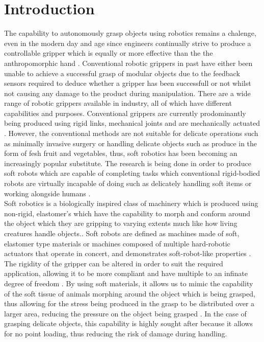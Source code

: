 \documentclass[11pt,twocolumn]{article}
\begin{document}
\section{Introduction}
The capability to autonomously grasp objects using robotics remains a chalenge, even in the modern day and age since engineers continually strive to produce a controllable gripper which is equally or more effective than the the anthropomorphic hand \cite{bogue2016flexible}. Conventional robotic grippers in past have either been unable to achieve a successful grasp of modular objects due to the feedback sensors required to deduce whether a gripper has been successfull or not whilst not causing any damage to the product during manipulation. There are a wide range of robotic grippers available in industry, all of which have different capabilities and purposes. Conventional grippers are currently prodominantly being produced using rigid links, mechanical joints and are mechanically actuated \cite{ilievski2011soft}. However, the conventional methods are not suitable for delicate operations such as minimally invasive surgery or handling delicate objects such as produce in the form of fesh fruit and vegetables, thus, soft robotics has been becoming an increasingly popular substitute. The research is being done in order to produce soft robots which are capable of completing tasks which conventional rigid-bodied robots are virtually incapable of doing such as delicately handling soft items or working alongside humans \cite{bilodeau2015monolithic}.
\\
\newline
Soft robotics is a biologically inspired class of machinery which is produced using non-rigid, elastomer's which have the capability to morph and conform around the object which they are gripping to varying extents much like how living creatures handle objects.\cite{ilievski2011soft,bilodeau2015monolithic,mosadegh2014pneumatic,martinez2013robotic,marchese2015recipe}. Soft robots are defined as machines made of soft, elastomer type materials or machines composed of multiple hard-robotic actuators that operate in concert, and demonstrates soft-robot-like properties \cite{ilievski2011soft}. The rigidity of the gripper can be altered in order to suit the required application, allowing it to be more compliant and have multiple to an infinate degree of freedom \cite{hassan2015design}. By using soft materials, it allows us to mimic the capability of the soft tissue of animals morphing around the object which is being grasped, thus allowing for the stress being produced in the grasp to be distributed over a larger area, reducing the pressure on the object being grasped \cite{ilievski2011soft}. In the case of grasping delicate objects, this capability is highly sought after because it allows for no point loading, thus reducing the risk of damage  during handling.
\end{document}
